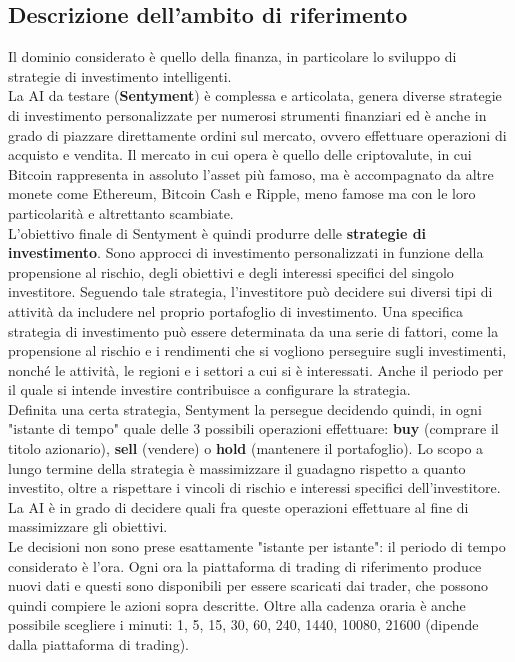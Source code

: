 \documentclass{article}
\begin{document}
	\subsection{Descrizione dell'ambito di riferimento}
		Il dominio considerato è quello della finanza, in particolare lo sviluppo di strategie di investimento intelligenti.\\
		La AI da testare (\textbf{Sentyment}) è complessa e articolata, genera diverse strategie di investimento personalizzate per numerosi strumenti finanziari ed è anche in grado di piazzare direttamente ordini sul mercato, ovvero effettuare operazioni di acquisto e vendita. Il mercato in cui opera è quello delle criptovalute, in cui Bitcoin rappresenta in assoluto l'asset più famoso, ma è accompagnato da altre monete come Ethereum, Bitcoin Cash e Ripple, meno famose ma con le loro particolarità e altrettanto scambiate.\\
		L'obiettivo finale di Sentyment è quindi produrre delle \textbf{strategie di investimento}. Sono approcci di investimento personalizzati in funzione della propensione al rischio, degli obiettivi e degli interessi specifici del singolo investitore. Seguendo tale strategia, l’investitore può decidere sui diversi tipi di attività da includere nel proprio portafoglio di investimento. Una specifica strategia di investimento può essere determinata da una serie di fattori, come la propensione al rischio e i rendimenti che si vogliono perseguire sugli investimenti, nonché le attività, le regioni e i settori a cui si è interessati. Anche il periodo per il quale si intende investire contribuisce a configurare la strategia.\\
		Definita una certa strategia, Sentyment la persegue decidendo quindi, in ogni "istante di tempo" quale delle 3 possibili operazioni effettuare: \textbf{buy} (comprare il titolo azionario), \textbf{sell} (vendere) o \textbf{hold} (mantenere il portafoglio). Lo scopo a lungo termine della strategia è massimizzare il guadagno rispetto a quanto investito, oltre a rispettare i vincoli di rischio e interessi specifici dell'investitore. La AI è in grado di decidere quali fra queste operazioni effettuare al fine di massimizzare gli obiettivi.\\
		Le decisioni non sono prese esattamente "istante per istante": il periodo di tempo considerato è l'ora. Ogni ora la piattaforma di trading di riferimento produce nuovi dati e questi sono disponibili per essere scaricati dai trader, che possono quindi compiere le azioni sopra descritte. Oltre alla cadenza oraria è anche possibile scegliere i minuti: 1, 5, 15, 30, 60, 240, 1440, 10080, 21600 (dipende dalla piattaforma di trading).\\
		
\end{document}
